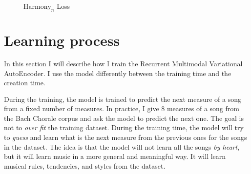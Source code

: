 \documentclass[12pt]{report}
\begin{document}
\begin{figure}[htbp]
\begin{minipage}{0.5\textwidth}
\begin{center}
        \end{center}
        \caption{$\text{Harmony}_n$ Loss}
        \label{fig:loss_harmony_n}
    \end{minipage}
\end{figure}

\section{Learning process}
\label{sec:learning-process}


In this section I will describe how I train the Recurrent Multimodal Variational AutoEncoder.
I use the model differently between the training time and the creation time.

During the training, the model is trained to predict the next measure of a song from a fixed number of measures.
In practice, I give 8 measures of a song from the Bach Chorale corpus and ask the model to predict the next one.
The goal is not to \textit{over fit} the training dataset.
During the training time, the model will try to \textit{guess} and learn what is the next measure from the previous ones for the songs in the dataset.
The idea is that the model will not learn all the songs \textit{by heart}, but it will learn music in a more general and meaningful way.
It will learn musical rules, tendencies, and styles from the dataset.
\end{document}
